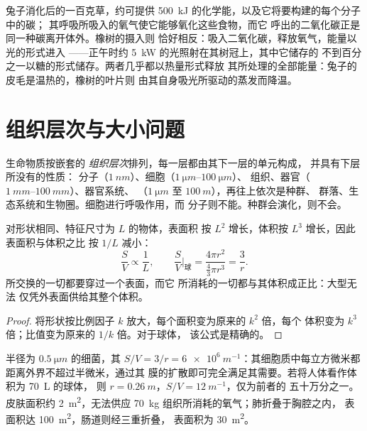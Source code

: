 \begin{example}[兔子与橡树]\label{ex:b1:organism-environment:rabbitoak}
兔子消化后的一百克草，约可提供
\qty{500}{kJ} 的化学能，以及它将要构建的每个分子中的碳；
其呼吸所吸入的氧气使它能够氧化这些食物，而它
呼出的二氧化碳正是同一种碳离开体外。橡树的摄入则
恰好相反：吸入二氧化碳，释放氧气，能量以光的形式进入
——正午时约 \qty{5}{kW} 的光照射在其树冠上，其中它储存的
不到百分之一以糖的形式储存。两者几乎都以热量形式释放
其所处理的全部能量：兔子的皮毛是温热的，橡树的叶片则
由其自身吸光所驱动的蒸发而降温。
\end{example}

\section{组织层次与大小问题}

\begin{definition}[组织层次]\label{def:b1:organism-environment:levels}
生命物质按嵌套的
\emph{组织层次}排列，每一层都由其下一层的单元构成，
并具有下层所没有的性质：
分子（$\qty{1}{nm}$）、细胞（$\qtyrange{1}{100}{\micro m}$）、
组织、器官（$\qtyrange{1}{100}{mm}$）、器官系统、
（$\qty{1}{\micro m}$ 至 $\qty{100}{m}$），再往上依次是种群、
群落、生态系统和生物圈。细胞进行呼吸作用，而
分子则不能。种群会演化，则不会。
\end{definition}

\begin{proposition}[表面与体积]\label{prop:b1:organism-environment:sv}
对形状相同、特征尺寸为 $L$ 的物体，表面积
按 $L^2$ 增长，体积按 $L^3$ 增长，因此表面积与体积之比
按 $1/L$ 减小：
\[
\frac{S}{V} \propto \frac{1}{L}, \qquad
\frac{S}{V}\Big|_{\text{球}} = \frac{4\pi r^2}{\tfrac{4}{3}\pi r^3} = \frac{3}{r}.
\]
所交换的一切都要穿过一个表面，而它
所消耗的一切都与其体积成正比：大型无法
仅凭外表面供给其整个体积。
\end{proposition}
\begin{proof}
将形状按比例因子 $k$ 放大，每个面积变为原来的 $k^2$ 倍，每个
体积变为 $k^3$ 倍；比值变为原来的 $1/k$ 倍。对于球体，
该公式是精确的。
\end{proof}

\begin{example}[细菌与人]\label{ex:b1:organism-environment:svnumbers}
半径为 $\qty{0.5}{\micro m}$ 的细菌，其
$S/V = 3/r = \qty{6e6}{m^{-1}}$：其细胞质中每立方微米都
距离外界不超过半微米，通过其
膜的扩散即可完全满足其需要。若将人体看作体积为 \qty{70}{L} 的球体，
则 $r = \qty{0.26}{m}$，$S/V = \qty{12}{m^{-1}}$，仅为前者的
五十万分之一。皮肤面积约 \qty{2}{m^2}，无法供应
\qty{70}{kg} 组织所消耗的氧气；肺折叠于胸腔之内，
表面积达 \qty{100}{m^2}，肠道则经三重折叠，
表面积为 \qty{30}{m^2}。
\end{example}

